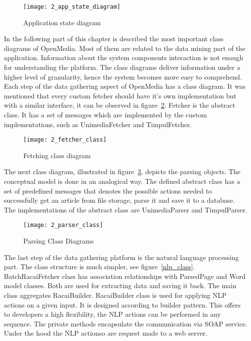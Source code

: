 \begin{figure}[!ht]
\centering
\texttt{[image: 2\_app\_state\_diagram]}
\caption{Application state diagram}\label{app_state_diagram}
\end{figure}

In the following part of this chapter is described the most important class diagrams of \mbox{OpenMedia}. Most of them are related to the data mining part of the application. Information about the system components interaction is not enough for understanding the platform. The class diagrams deliver information under a higher level of granularity, hence the system becomes more easy to comprehend. Each step of the data gathering aspect of OpenMedia has a class diagram. It was mentioned that every custom fetcher should have it's own implementation but with a similar interface, it can be observed in \mbox{figure \ref{fetcher_class}}. Fetcher is the abstract class. It has a set of messages which are implemented by the custom implementations, such as UnimediaFetcher and TimpulFetcher.

\begin{figure}[!ht]
\centering
\vspace*{0.6cm}
\texttt{[image: 2\_fetcher\_class]}
\caption{Fetching class diagram}\label{fetcher_class}
\end{figure}

The next class diagram, illustrated in \mbox{figure \ref{parser_class}}, depicts the parsing objects. The conceptual model is done in an analogical way. The defined abstract class has a set of predefined messages that denotes the possible actions needed to successfully get an article from file storage, parse it and save it to a database. The implementations of the abstract class are UnimediaParser and TimpulParser.

\begin{figure}[!h]
\centering
\texttt{[image: 2\_parser\_class]}
\caption{Parsing Class Diagrams}\label{parser_class}
\end{figure}

The last step of the data gathering platform is the natural language processing part. The class structure is much simpler, see \mbox{figure \ref{nlp_class}}. BatchRacaiFetcher class has association relationships with ParsedPage and Word model classes. Both are used for extracting data and saving it back. The main class aggregates RacaiBuilder. RacaiBuilder class is used for applying NLP actions on a given input. It is designed according to builder pattern. This offers to developers a high flexibility, the NLP actions can be performed in any sequence. The private methods encapsulate the communication via SOAP service. Under the hood the NLP actionso are request made to a web server.

